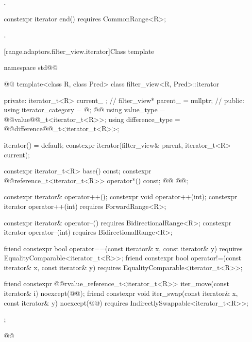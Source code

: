 \begin{itemdescr}
\pnum
\returns {}.
\end{itemdescr}

\begin{itemdecl}
constexpr iterator end() requires CommonRange<R>;
\end{itemdecl}

\begin{itemdescr}
\pnum
\returns {}.
\end{itemdescr}

[range.adaptors.filter_view.iterator]{Class template }

%
\begin{codeblock}
namespace std@@ { @@
  template<class R, class Pred>
  class filter_view<R, Pred>::iterator {
  private:
    iterator_t<R> current_ {}; // \expos
    filter_view* parent_ = nullptr; // \expos
  public:
    using iterator_category = @\seebelownc@;
    @@
    using value_type        = @@value@@_t<iterator_t<R>>;
    using difference_type   = @@difference@@_t<iterator_t<R>>;

    iterator() = default;
    constexpr iterator(filter_view& parent, iterator_t<R> current);

    constexpr iterator_t<R> base() const;
    constexpr @@reference_t<iterator_t<R>> operator*() const;
    @@
      @@;

    constexpr iterator& operator++();
    constexpr void operator++(int);
    constexpr iterator operator++(int) requires ForwardRange<R>;

    constexpr iterator& operator--() requires BidirectionalRange<R>;
    constexpr iterator operator--(int) requires BidirectionalRange<R>;

    friend constexpr bool operator==(const iterator& x, const iterator& y)
      requires EqualityComparable<iterator_t<R>>;
    friend constexpr bool operator!=(const iterator& x, const iterator& y)
      requires EqualityComparable<iterator_t<R>>;

    friend constexpr @@rvalue_reference_t<iterator_t<R>> iter_move(const iterator& i)
      noexcept(@\oldtxt{\seebelow}@);
    friend constexpr void iter_swap(const iterator& x, const iterator& y)
      noexcept(@\oldtxt{\seebelow}@)
      requires IndirectlySwappable<iterator_t<R>>;
  };
}@\oldtxt{\}}@
\end{codeblock}

